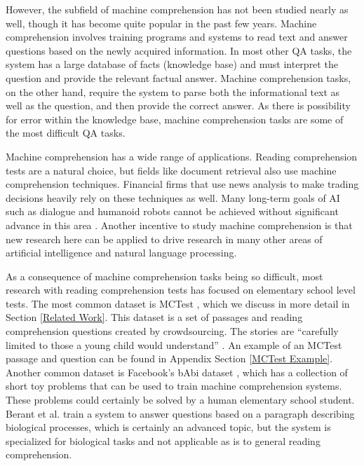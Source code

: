 \documentclass[pageno]{final_paper}
\begin{document}
However, the subfield of machine comprehension has not been studied nearly as
well, though it has become quite popular in the past few years. Machine
comprehension involves training programs and systems to read text and answer
questions based on the newly acquired information. In most other QA tasks, the
system has a large database of facts (knowledge base) and must interpret the
question and provide the relevant factual answer. Machine comprehension tasks,
on the other hand, require the system to parse both the informational text as
well as the question, and then provide the correct answer. As there is
possibility for error within the knowledge base, machine comprehension tasks
are some of the most difficult QA tasks.

Machine comprehension has a wide range of applications. Reading comprehension
tests are a natural choice, but fields like document retrieval also use machine
comprehension techniques. Financial firms that use news analysis to make
trading decisions heavily rely on these techniques as well. Many long-term
goals of AI such as dialogue and humanoid robots cannot be achieved without
significant advance in this area \cite{Weston2015}. Another incentive to
study machine comprehension is that new research here can be applied to drive
research in many other areas of artificial intelligence and natural language
processing.

As a consequence of machine comprehension tasks being so difficult, most
research with reading comprehension tests has focused on elementary school level
tests. The most common dataset is MCTest \cite{Richardson2013}, which we discuss
in more detail in Section \ref{Related Work}. This dataset is a set of passages
and reading comprehension questions created by crowdsourcing. The stories are
``carefully limited to those a young child would understand''
\cite{Richardson2013}. An example of an MCTest passage and question can be found
in Appendix Section \ref{MCTest Example}. Another common dataset is
Facebook's bAbi dataset \cite{Weston2015}, which has a collection of short toy
problems that can be used to train machine comprehension systems. These problems
could certainly be solved by a human elementary school student. Berant et al.
\cite{Berant2014} train a system to answer questions based on a paragraph
describing biological processes, which is certainly an advanced topic, but the
system is specialized for biological tasks and not applicable as is to general
reading comprehension.
\end{document}
